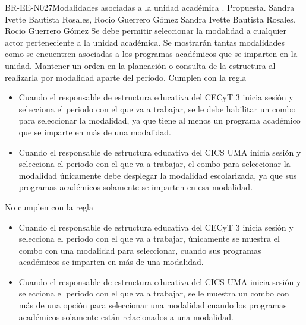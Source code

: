 \begin{BusinessRule}{BR-EE-N027}{Modalidades asociadas a la unidad académica}
	{\bcCondition}    %
	{\btEnabler}     %
	{\blControlling}    %
	.
	\BRItem[Estado] Propuesta.
	 Sandra Ivette Bautista Rosales, Rocio Guerrero Gómez
	 Sandra Ivette Bautista Rosales, Rocio Guerrero Gómez
	\BRItem[Descripción] Se debe permitir seleccionar la modalidad a cualquier actor perteneciente a la unidad académica. Se mostrarán tantas modalidades como se encuentren asociadas a los programas académicos que se imparten en la unidad.
	\BRItem[Motivación] Mantener un orden en la planeación o consulta de la estructura al realizarla por modalidad aparte del periodo.
		 Cumplen con la regla
		\begin{itemize}
			\item Cuando el responsable de estructura educativa del CECyT 3 inicia sesión y selecciona el periodo con el que va a trabajar, se le debe habilitar un combo para seleccionar la modalidad, ya que tiene al menos un programa académico que se imparte en más de una modalidad.
			\item Cuando el responsable de estructura educativa del CICS UMA inicia sesión y selecciona el periodo con el que va a trabajar, el combo para seleccionar la modalidad únicamente debe desplegar la modalidad escolarizada, ya que sus programas académicos solamente se imparten en esa modalidad.
		\end{itemize}
		 No cumplen con la regla
		\begin{itemize}
			\item Cuando el responsable de estructura educativa del CECyT 3 inicia sesión y selecciona el periodo con el que va a trabajar, únicamente se muestra el combo con una modalidad para seleccionar, cuando sus programas académicos se imparten en más de una modalidad.
			\item Cuando el responsable de estructura educativa del CICS UMA inicia sesión y selecciona el periodo con el que va a trabajar, se le muestra un combo con más de una opción para seleccionar una modalidad cuando los programas académicos solamente están relacionados a una modalidad.
		\end{itemize}
\end{BusinessRule}


